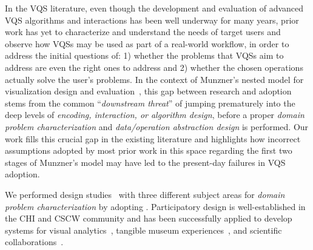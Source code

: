   \par In the VQS literature, even though the development and evaluation of advanced VQS algorithms and interactions has been well underway for many years, prior work has yet to characterize and understand the needs of target users and observe how VQSs may be used as part of a real-world workflow, in order to address the initial questions of: 1) whether the problems that VQSs aim to address are even the right ones to address and 2) whether the chosen operations actually solve the user's problems. In the context of Munzner's nested model for visualization design and evaluation~\cite{munzner2009nested}, this gap between research and adoption stems from the common ``\textit{downstream threat}'' of jumping prematurely into the deep levels of \textit{encoding, interaction, or algorithm design}, before a proper \textit{domain problem characterization} and \textit{data/operation abstraction design} is performed. Our work fills this crucial gap in the existing literature and highlights how incorrect assumptions adopted by most prior work in this space regarding the first two stages of Munzner's model may have led to the present-day failures in VQS adoption.
  \par We performed design studies~\cite{lam2012empirical,shneiderman2006strategies,Sedlmair2012} with three different subject areas for \textit{domain problem characterization} by adopting .  Participatory design is well-established in the CHI and CSCW community and has been successfully applied to develop systems for visual analytics~\cite{Aragon2008,Chuang2012}, tangible museum experiences~\cite{Ciolfi2016}, and scientific collaborations~\cite{Poon2008,Chen2016}.  
